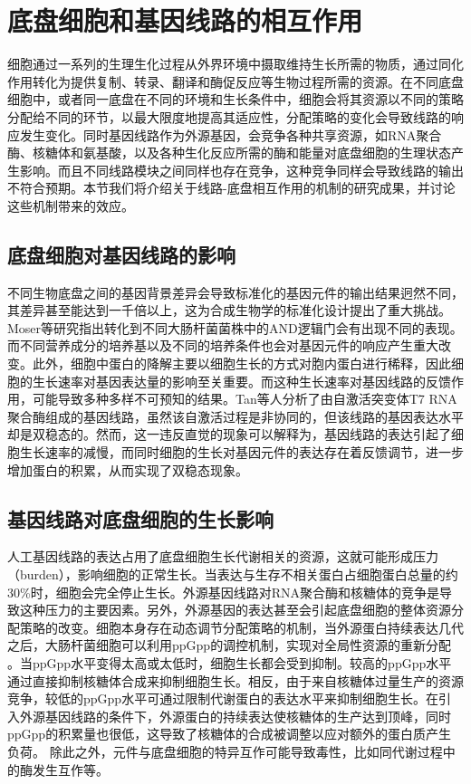 \documentclass[b5paper,11pt,onecolumn,twoside,UTF8]{article}
\begin{document}
\section{底盘细胞和基因线路的相互作用}
细胞通过一系列的生理生化过程从外界环境中摄取维持生长所需的物质，通过同化作用转化为提供复制、转录、翻译和酶促反应等生物过程所需的资源。在不同底盘细胞中，或者同一底盘在不同的环境和生长条件中，细胞会将其资源以不同的策略分配给不同的环节，以最大限度地提高其适应性\cite{Scott2010, you2013, hui2015}，分配策略的变化会导致线路的响应发生变化。同时基因线路作为外源基因，会竞争各种共享资源，如RNA聚合酶、核糖体和氨基酸，以及各种生化反应所需的酶和能量\cite{Borkowski2016, Towbin2017}对底盘细胞的生理状态产生影响。而且不同线路模块之间同样也存在竞争，这种竞争同样会导致线路的输出不符合预期。本节我们将介绍关于线路-底盘相互作用的机制的研究成果，并讨论这些机制带来的效应。
\subsection{底盘细胞对基因线路的影响}
\indent 不同生物底盘之间的基因背景差异会导致标准化的基因元件的输出结果迥然不同\cite{cardinale2013effects}，其差异甚至能达到一千倍以上\cite{vilanova2015standards}，这为合成生物学的标准化设计提出了重大挑战。Moser等研究指出转化到不同大肠杆菌菌株中的AND逻辑门会有出现不同的表现\cite{moser2012genetic}。而不同营养成分的培养基以及不同的培养条件也会对基因元件的响应产生重大改变。此外，细胞中蛋白的降解主要以细胞生长的方式对胞内蛋白进行稀释\cite{Hintsche2013}，因此细胞的生长速率对基因表达量的影响至关重要。而这种生长速率对基因线路的反馈作用，可能导致多种多样不可预知的结果。Tan等人分析了由自激活突变体T7 RNA聚合酶组成的基因线路，虽然该自激活过程是非协同的，但该线路的基因表达水平却是双稳态的。然而，这一违反直觉的现象可以解释为，基因线路的表达引起了细胞生长速率的减慢，而同时细胞的生长对基因元件的表达存在着反馈调节，进一步增加蛋白的积累，从而实现了双稳态现象\cite{Tan2009}。
\subsection{基因线路对底盘细胞的生长影响} %
\indent 人工基因线路的表达占用了底盘细胞生长代谢相关的资源，这就可能形成压力（burden）\cite{10.1093/nar/gkv1280}，影响细胞的正常生长。当表达与生存不相关蛋白占细胞蛋白总量的约30\%时，细胞会完全停止生长\cite{Vind1993, Scott2010}。外源基因线路对RNA聚合酶和核糖体\cite{Liu2018a}的竞争是导致这种压力的主要因素。另外，外源基因的表达甚至会引起底盘细胞的整体资源分配策略的改变。细胞本身存在动态调节分配策略的机制\cite{10.1016/j.molcel.2010.04.015, zhu2019growth}，当外源蛋白持续表达几代之后，大肠杆菌细胞可以利用ppGpp的调控机制，实现对全局性资源的重新分配 \cite{zhu2019growth}。当ppGpp水平变得太高或太低时，细胞生长都会受到抑制。较高的ppGpp水平通过直接抑制核糖体合成来抑制细胞生长。相反，由于来自核糖体过量生产的资源竞争，较低的ppGpp水平可通过限制代谢蛋白的表达水平来抑制细胞生长。在引入外源基因线路的条件下，外源蛋白的持续表达使核糖体的生产达到顶峰，同时ppGpp的积累量也很低，这导致了核糖体的合成被调整以应对额外的蛋白质产生负荷。 除此之外，元件与底盘细胞的特异互作可能导致毒性，比如同代谢过程中的酶发生互作等。%
\end{document}
